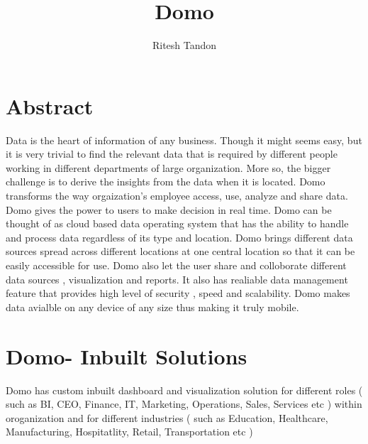
\title{Domo}

\author{Ritesh Tandon}

\maketitle

\renewcommand{\shortauthors}{R. Tandon}


\section{Abstract}

Data is the heart of information of any business. 
Though it might seems easy, but it is very trivial 
to find the relevant data that is required by different 
people working in different departments of large organization. 
More so, the bigger challenge is to derive the insights 
from the data when it is located.
Domo transforms the way orgaization's employee access, use, 
analyze and share data. Domo gives the power to users to 
make decision in real time. Domo can be thought of as cloud 
based data operating system that has the ability to handle 
and process data regardless of its type and location. 
Domo brings different data sources spread across different 
locations at one central location so that it can be easily 
accessible for use. Domo also let the user share and 
colloborate different data sources , visualization and 
reports. It also has realiable data management feature 
that provides high level of security , speed and scalability. 
Domo makes data avialble on any device of any size thus 
making it truly mobile.



\section{Domo- Inbuilt Solutions}

Domo has custom inbuilt dashboard and visualization solution 
for different roles ( such as BI, CEO, Finance, IT, Marketing, 
Operations, Sales, Services etc )  within oroganization and 
for different industries ( such as Education, Healthcare, 
Manufacturing, Hospitatlity, Retail, Transportation etc )


